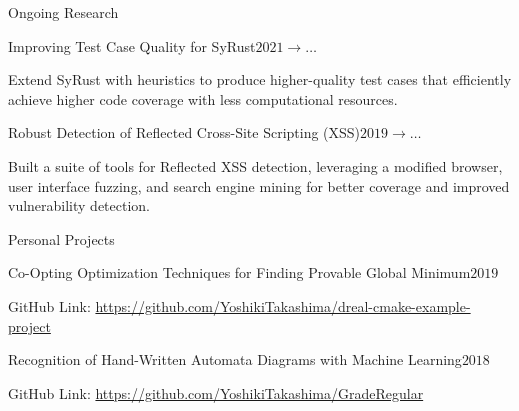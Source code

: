 \documentclass{resume} %
\begin{document}
\begin{rSection}{Ongoing Research}
  \begin{rSubsection}{Improving Test Case Quality for SyRust}{$2021
      \rightarrow \ldots$}{}{}
  \item Extend SyRust with heuristics to produce higher-quality test
    cases that efficiently achieve higher code coverage with less
    computational resources.
  \end{rSubsection}
  \begin{rSubsection}{Robust Detection of Reflected Cross-Site
      Scripting (XSS)}{$2019 \rightarrow \ldots$}{}{}
  \item Built a suite of tools for Reflected XSS detection,
    leveraging a modified browser, user interface fuzzing, and search
    engine mining for better coverage and improved vulnerability
    detection.
  \end{rSubsection}
\end{rSection}


\begin{rSection}{Personal Projects}
  \begin{rSubsection}{Co-Opting Optimization Techniques for Finding
      Provable Global Minimum}{$2019$}{}{}
  \item GitHub Link:
    \href{https://github.com/YoshikiTakashima/dreal-cmake-example-project}
    {https://github.com/YoshikiTakashima/dreal-cmake-example-project}
  \end{rSubsection}
  \begin{rSubsection}{Recognition of Hand-Written Automata Diagrams with
      Machine Learning}{$2018$}{}{}
  \item GitHub Link:
    \href{https://github.com/YoshikiTakashima/GradeRegular}
    {https://github.com/YoshikiTakashima/GradeRegular}
  \end{rSubsection}
\end{rSection}
\end{document}
